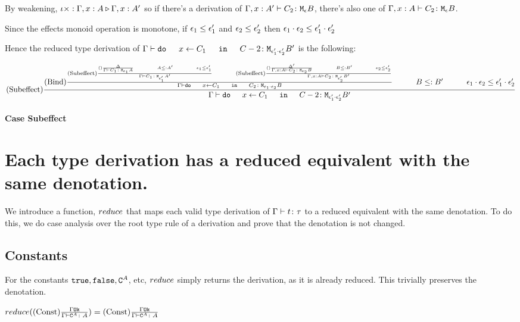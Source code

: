{    By weakening, $\iota\times : \Gamma, x:A \triangleright \Gamma, x: A'$ so if there's a derivation of $\Gamma, x:A' \vdash C_2 \colon \texttt{M}_{\epsilon}{B}$, there's also one of   $\Gamma, x: A \vdash C_2 \colon \texttt{M}_{\epsilon}{B}$.

    Since the effects monoid operation is monotone, if $\epsilon_1\leq\epsilon_1'$ and $\epsilon_2\leq\epsilon_2'$ then $\epsilon_1\cdot\epsilon_2 \leq \epsilon_1'\cdot\epsilon_2'$

    Hence the reduced type derivation of $\gtyperelation{\doin{x}{C_1}{C-2}}{\M{\e_1'\dot\e_2'}{B'}}$ is the following:

    \begin{equation}
        \treerule{Subeffect} {
            \treerule{Bind}{
                \deltacrule{\G}{C_1}{\e_1}{A}{\e_1'}{A'}
                \s\s
                \deltacruleprime{\G, x:A}{C_2}{\e_2}{B}{\e_2'}{B'}
            } {
                \gtyperelation{\doin{x}{C_1}{C_2}}{\M{\e_1\dot\e_2}{B}}
            }
            \s\s
            B\subtype B'
            \s\s
            \e_1\dot\e_2\subeffect\e_1'\dot\e_2'
        } {
            \gtyperelation{\doin{x}{C_1}{C-2}}{\M{\e_1'\dot\e_2'}{B'}}
        }
    \end{equation}

    \paragraph{Case Subeffect}

    \section{Each type derivation has a reduced equivalent with the same denotation.}
    We introduce a function, $reduce$ that maps each valid type derivation of $\Gamma \vdash t \colon \tau$ to a reduced equivalent with the same denotation. To do this, we do case analysis over the root type rule of a derivation and prove that the denotation is not changed. 

        \subsection{Constants}
            For the constants $\texttt{true}, \texttt{false}, \texttt{C}^{A}$, etc, $reduce$ simply returns the derivation, as it is already reduced. This trivially preserves the denotation.

            $reduce((\text{Const}) \frac{\Gamma \texttt{Ok}}{\Gamma \vdash \texttt{C}^{A} \colon A}) = (\text{Const}) \frac{\Gamma \texttt{Ok}}{\Gamma \vdash \texttt{C}^{A} \colon A}$

}
